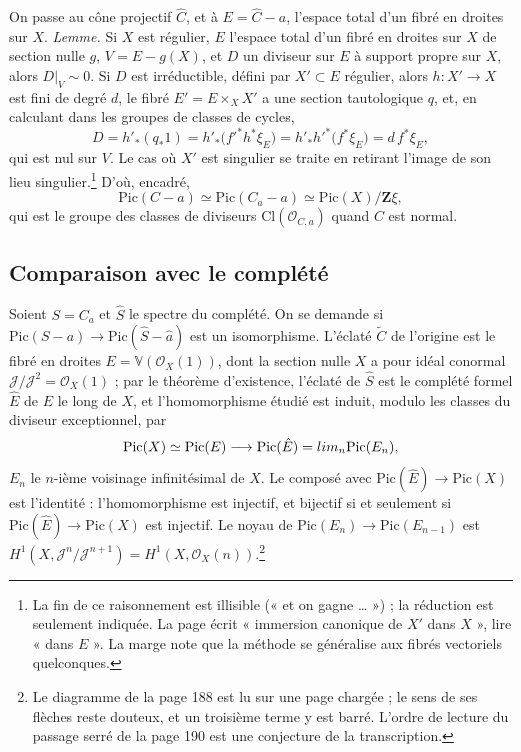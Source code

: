 \documentclass[11pt,a4paper]{article}
\begin{document}
On passe au cône projectif $\hat{C}$, et à $E = \hat{C} - a$, l'espace total
d'un fibré en droites sur $X$. \emph{Lemme.} Si $X$ est régulier, $E$ l'espace
total d'un fibré en droites sur $X$ de section nulle $g$, $V = E - g(X)$, et
$D$ un diviseur sur $E$ à support propre sur $X$, alors $D|_V \sim 0$. Si $D$
est irréductible, défini par $X' \subset E$ régulier, alors $h \colon X' \to X$
est fini de degré $d$, le fibré $E' = E \times_X X'$ a une section
tautologique $q$, et, en calculant dans les groupes de classes de cycles,
\[
D = h'_*(q_*1) = h'_*\bigl(f'^*h^*\xi_E\bigr) = h'_*h'^*\bigl(f^*\xi_E\bigr) = d\, f^*\xi_E ,
\]
qui est nul sur $V$. Le cas où $X'$ est singulier se traite en retirant
l'image de son lieu singulier.\footnote{La fin de ce raisonnement est
illisible (« et on gagne … ») ; la réduction est seulement indiquée. La page
écrit « immersion canonique de $X'$ dans $X$ », lire « dans $E$ ». La marge
note que la méthode se généralise aux fibrés vectoriels quelconques.} D'où,
encadré,
\[
\mathrm{Pic}(C - a) \simeq \mathrm{Pic}(C_a - a) \simeq \mathrm{Pic}(X)/\mathbf{Z}\xi ,
\]
qui est le groupe des classes de diviseurs $\mathrm{Cl}(\mathcal{O}_{C,a})$
quand $C$ est normal.

\subsection*{Comparaison avec le complété}

Soient $S = C_a$ et $\hat{S}$ le spectre du complété. On se demande si
$\mathrm{Pic}(S - a) \to \mathrm{Pic}(\hat{S} - \hat{a})$ est un isomorphisme.
L'éclaté $\tilde{C}$ de l'origine est le fibré en droites
$E = \mathbb{V}(\mathcal{O}_X(1))$, dont la section nulle $X$ a pour idéal
conormal $\mathcal{J}/\mathcal{J}^2 = \mathcal{O}_X(1)$ ; par le théorème
d'existence, l'éclaté de $\hat{S}$ est le complété formel $\hat{E}$ de $E$ le
long de $X$, et l'homomorphisme étudié est induit, modulo les classes du
diviseur exceptionnel, par
\[
\mathrm{Pic}(X) \simeq \mathrm{Pic}(E) \longrightarrow \mathrm{Pic}(\hat{E}) = \varprojlim_n \mathrm{Pic}(E_n),
\]
$E_n$ le $n$-ième voisinage infinitésimal de $X$. Le composé avec
$\mathrm{Pic}(\hat{E}) \to \mathrm{Pic}(X)$ est l'identité : l'homomorphisme
est injectif, et bijectif si et seulement si $\mathrm{Pic}(\hat{E}) \to \mathrm{Pic}(X)$
est injectif. Le noyau de $\mathrm{Pic}(E_n) \to \mathrm{Pic}(E_{n-1})$ est
$H^1(X, \mathcal{J}^n/\mathcal{J}^{n+1}) = H^1(X, \mathcal{O}_X(n))$.\footnote{Le
diagramme de la page 188 est lu sur une page chargée ; le sens de ses flèches
reste douteux, et un troisième terme y est barré. L'ordre de lecture du passage
serré de la page 190 est une conjecture de la transcription.}
\end{document}
